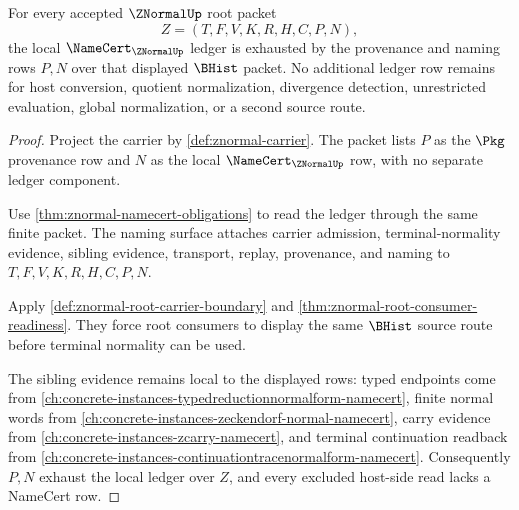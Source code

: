 \begin{theorem}
\label{thm:znormal-namecert-ledger-exhaustion}
For every accepted $\ZNormalUp$ root packet
$$
Z=(T,F,V,K,R,H,C,P,N),
$$
the local $\NameCert_{\ZNormalUp}$ ledger is exhausted by the provenance and naming rows $P,N$ over that displayed $\BHist$ packet. No additional ledger row remains for host conversion, quotient normalization, divergence detection, unrestricted evaluation, global normalization, or a second source route.
\end{theorem}
\begin{proof}
Project the carrier by \autoref{def:znormal-carrier}. The packet lists $P$ as the $\Pkg$ provenance row and $N$ as the local $\NameCert_{\ZNormalUp}$ row, with no separate ledger component.

Use \autoref{thm:znormal-namecert-obligations} to read the ledger through the same finite packet. The naming surface attaches carrier admission, terminal-normality evidence, sibling evidence, transport, replay, provenance, and naming to $T,F,V,K,R,H,C,P,N$.

Apply \autoref{def:znormal-root-carrier-boundary} and \autoref{thm:znormal-root-consumer-readiness}. They force root consumers to display the same $\BHist$ source route before terminal normality can be used.

The sibling evidence remains local to the displayed rows: typed endpoints come from \autoref{ch:concrete-instances-typedreductionnormalform-namecert}, finite normal words from \autoref{ch:concrete-instances-zeckendorf-normal-namecert}, carry evidence from \autoref{ch:concrete-instances-zcarry-namecert}, and terminal continuation readback from \autoref{ch:concrete-instances-continuationtracenormalform-namecert}. Consequently $P,N$ exhaust the local ledger over $Z$, and every excluded host-side read lacks a NameCert row.
\end{proof}
